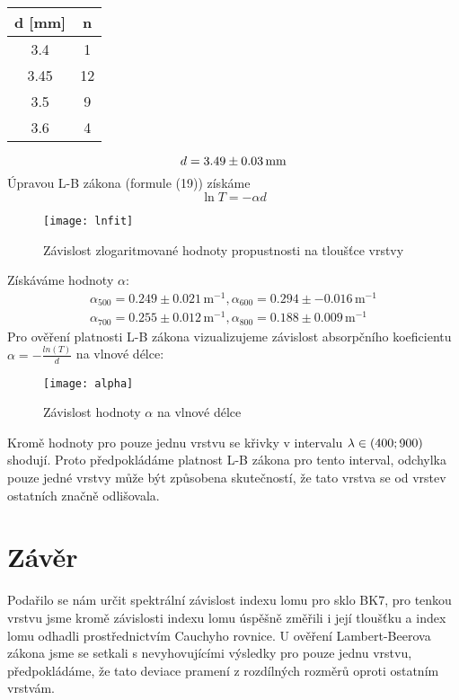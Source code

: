 \documentclass[czech,11pt,a4paper]{article}
\begin{document}
\begin{multicols}{2}
		\begin{center}
			\begin{center}
					\begin{tabular}{|c|c|}
				\hline
				d [mm] & n  \\ \hline
				3.4    & 1  \\ \hline
				3.45   & 12 \\ \hline
				3.5    & 9  \\ \hline
				3.6    & 4  \\ \hline
			\end{tabular}
			\end{center}
		\end{center}
	\begin{equation}
		d = 3.49 \pm 0.03 \,\rm mm
	\end{equation}
	Úpravou L-B zákona (formule (19)) získáme
	\begin{equation*}
		 {\ln T} = - \alpha d 
	\end{equation*}
	\begin{figure}[H]
	\begin{center}
		\texttt{[image: lnfit]}
		\caption{Závislost zlogaritmované hodnoty propustnosti na tloušťce vrstvy}
	\end{center}
	\end{figure}
	Získáváme hodnoty $\alpha$:
	{\small \begin{gather*}
		\alpha_{500} = 0.249\pm0.021\, \mathrm{m^{-1}} , \alpha_{600} = 0.294\pm-0.016\, \mathrm{m^{-1}}\\
		\alpha _{700} = 0.255 \pm 0.012\,\mathrm{m^{-1}}, \alpha_{800} = 0.188 \pm 0.009 \,\mathrm{m^{-1}}
	\end{gather*}}
	Pro ověření platnosti L-B zákona vizualizujeme závislost absorpčního koeficientu  $\alpha = - \frac{ln(T)}{d}$ na vlnové délce:
	\begin{figure}[H]
		\begin{center}
			\texttt{[image: alpha]}
			\caption{Závislost hodnoty $\alpha$ na vlnové délce}
		\end{center}
	\end{figure}
	Kromě hodnoty pro pouze jednu vrstvu se křivky v intervalu $\lambda \in (400; 900) \,\rm$ shodují. Proto předpokládáme platnost L-B zákona pro tento interval, odchylka pouze jedné vrstvy může být způsobena skutečností, že tato vrstva se od vrstev ostatních značně odlišovala.\newpage
	
	
	\section{Závěr}
	Podařilo se nám určit spektrální závislost indexu lomu pro sklo BK7, pro tenkou vrstvu jsme kromě závislosti indexu lomu úspěšně změřili i její tloušťku a index lomu odhadli prostřednictvím Cauchyho rovnice. U ověření Lambert-Beerova zákona jsme se setkali s nevyhovujícími výsledky pro pouze jednu vrstvu, předpokládáme, že tato deviace pramení z rozdílných rozměrů oproti ostatním vrstvám.
	

\end{multicols}
\end{document}
